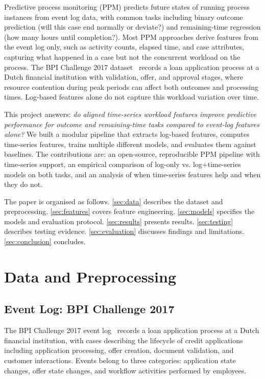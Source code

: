 \documentclass[runningheads]{llncs}
\begin{document}
Predictive process monitoring (PPM) predicts future states of running process
instances from event log data, with common tasks including binary
outcome prediction (will this case end normally or deviate?) and remaining-time
regression (how many hours until completion?). Most PPM approaches derive
features from the event log only, such as activity counts, elapsed time, and case
attributes, capturing what happened in a case but not the
concurrent workload on the process. The BPI Challenge 2017
dataset~\cite{bpic2017} records a loan application process at a Dutch
financial institution with validation, offer, and approval stages, where
resource contention during peak periods can affect both
outcomes and processing times. Log-based features alone do not capture
this workload variation over time.

This project answers: \emph{do aligned time-series workload features
improve predictive performance for outcome and remaining-time tasks compared
to event-log features alone?} We built a modular pipeline that extracts
log-based features, computes time-series features, trains multiple different models,
and evaluates them against baselines. The contributions are: an open-source, reproducible PPM
pipeline with time-series support, an empirical comparison of log-only vs.
log+time-series models on both tasks, and an analysis of when time-series
features help and when they do not.

The paper is organised as follows. \autoref{sec:data} describes the dataset and
preprocessing. \autoref{sec:features} covers feature engineering.
\autoref{sec:models} specifies the models and evaluation protocol.
\autoref{sec:results} presents results. \autoref{sec:testing} describes testing
evidence. \autoref{sec:evaluation} discusses findings and limitations.
\autoref{sec:conclusion} concludes.

\section{Data and Preprocessing}
\label{sec:data}

\subsection{Event Log: BPI Challenge 2017}
\label{sec:bpic2017}
The BPI Challenge 2017 event log~\cite{bpic2017} records a loan application
process at a Dutch financial institution, with cases describing the lifecycle
of credit applications including application processing, offer creation,
document validation, and customer interactions. Events belong to three
categories: application state changes, offer state changes, and workflow
activities performed by employees.
\end{document}
